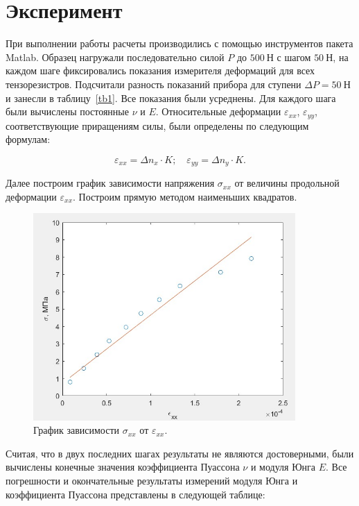 \documentclass[12pt, a4paper]{article}
\begin{document}
    \newpage
    
    \section{Эксперимент}
    
    При выполнении работы расчеты производились с помощью инструментов пакета Matlab. Образец нагружали последовательно силой $P$ до $500~\text{Н}$ с шагом $50~\text{Н}$, на каждом шаге фиксировались показания измерителя деформаций для всех тензорезистров. Подсчитали разность показаний прибора для ступени $\Delta P = 50~\text{Н}$ и занесли в таблицу~\ref{tb1}. Все показания были усреднены. Для каждого шага были вычислены постоянные $\nu$ и $E$. Относительные деформации $\varepsilon_{xx}$, $\varepsilon_{yy}$, соответствующие приращениям силы, были определены по следующим формулам:
    
    \begin{equation}
        \varepsilon_{xx} = \Delta n_{x} \cdot K; \quad \varepsilon_{yy} = \Delta n_{y} \cdot K.
    \end{equation}
    
    Далее построим график зависимости напряжения $\sigma_{xx}$ от величины продольной деформации $\varepsilon_{xx}$. Построим прямую методом наименьших квадратов.
    
    \begin{figure}[h]
        \centering
        \includegraphics[width = 10cm]{image_4.jpg}
        \caption{График зависимости $\sigma_{xx}$ от $\varepsilon_{xx}$.}
        \label{im4}
    \end{figure}
    
    Считая, что в двух последних шагах результаты не являются достоверными, были вычислены конечные значения коэффициента Пуассона $\nu$ и модуля Юнга $E$. Все погрешности и окончательные результаты измерений модуля Юнга и коэффициента Пуассона представлены в следующей таблице:
    
\end{document}
